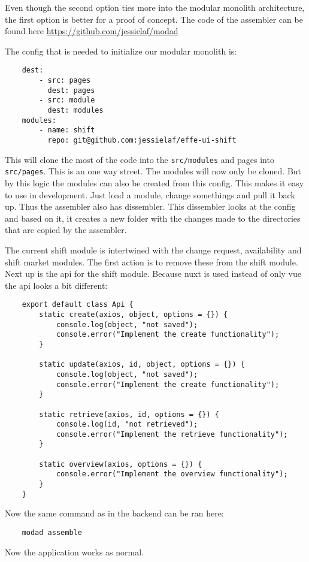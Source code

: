 Even though the second option ties more into the modular monolith architecture, the first option is better for a proof of concept. The code of the assembler can be found here \url{https://github.com/jessielaf/modad}

The config that is needed to initialize our modular monolith is:
\begin{verbatim}
    dest:
        - src: pages
          dest: pages
        - src: module
          dest: modules
    modules:
        - name: shift
          repo: git@github.com:jessielaf/effe-ui-shift

\end{verbatim}

This will clone the most of the code into the \texttt{src/modules} and pages into \texttt{src/pages}. This is an one way street. The modules will now only be cloned. But by this logic the modules can also be created from this config. This makes it easy to use in development. Just load a module, change somethings and pull it back up. Thus the assembler also has dissembler. This dissembler looks at the config and based on it, it creates a new folder with the changes made to the directories that are copied by the assembler.

The current shift module is intertwined with the change request, availability and shift market modules. The first action is to remove these from the shift module. Next up is the api for the shift module. Because nuxt is used instead of only vue the api looks a bit different:
\begin{verbatim}
    export default class Api {
        static create(axios, object, options = {}) {
            console.log(object, "not saved");
            console.error("Implement the create functionality");
        }

        static update(axios, id, object, options = {}) {
            console.log(object, "not saved");
            console.error("Implement the create functionality");
        }

        static retrieve(axios, id, options = {}) {
            console.log(id, "not retrieved");
            console.error("Implement the retrieve functionality");
        }

        static overview(axios, options = {}) {
            console.error("Implement the overview functionality");
        }
    }
\end{verbatim}

Now the same command as in the backend can be ran here:
\begin{verbatim}
    modad assemble
\end{verbatim}

Now the application works as normal.
